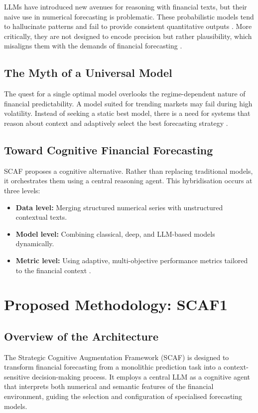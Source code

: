 \documentclass[conference]{IEEEtran}
\begin{document}
LLMs have introduced new avenues for reasoning with financial texts, but their naive use in numerical forecasting is problematic. These probabilistic models tend to hallucinate patterns and fail to provide consistent quantitative outputs \cite{luo2023llmbias}. More critically, they are not designed to encode precision but rather plausibility, which misaligns them with the demands of financial forecasting \cite{lin2022llmfinance}.

\subsection{The Myth of a Universal Model}
The quest for a single optimal model overlooks the regime-dependent nature of financial predictability. A model suited for trending markets may fail during high volatility. Instead of seeking a static best model, there is a need for systems that reason about context and adaptively select the best forecasting strategy \cite{zeng2022ltsflinear, yao2022react}.

\subsection{Toward Cognitive Financial Forecasting}
SCAF proposes a cognitive alternative. Rather than replacing traditional models, it orchestrates them using a central reasoning agent. This hybridisation occurs at three levels:
\begin{itemize}
\item \textbf{Data level:} Merging structured numerical series with unstructured contextual texts.
\item \textbf{Model level:} Combining classical, deep, and LLM-based models dynamically.
\item \textbf{Metric level:} Using adaptive, multi-objective performance metrics tailored to the financial context \cite{liu2021forecasting}.
\end{itemize}



\section{Proposed Methodology: SCAF1}

\subsection{Overview of the Architecture}
The Strategic Cognitive Augmentation Framework (SCAF) is designed to transform financial forecasting from a monolithic prediction task into a context-sensitive decision-making process. It employs a central LLM as a cognitive agent that interprets both numerical and semantic features of the financial environment, guiding the selection and configuration of specialised forecasting models.
\end{document}
